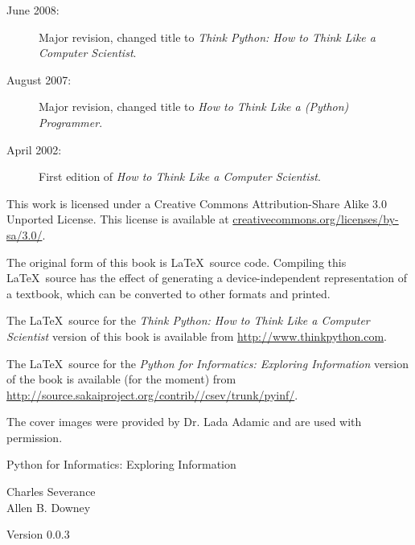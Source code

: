 \documentclass[10pt]{book}
\newcommand{\thetitle}{Python for Informatics: Exploring Information}
\newcommand{\theversion}{0.0.3}
\begin{document}
\begin{latexonly}
{\begin{description}
\item[June 2008:] Major revision, changed title to
{\em Think Python: How to Think Like
a Computer Scientist}.

\item[August 2007:] Major revision, changed title to
{\em How to Think Like a (Python) Programmer}.

\item[April 2002:] First edition of {\em How to Think Like
a Computer Scientist}.

\end{description}

\vspace{0.2in}


This work is licensed under a 
Creative Commons Attribution-Share Alike 3.0 Unported License.  This license is 
available at
\url{creativecommons.org/licenses/by-sa/3.0/}.

The original form of this book is \LaTeX\ source code.  Compiling this
\LaTeX\ source has the effect of generating a device-independent
representation of a textbook, which can be converted to other formats
and printed.

The \LaTeX\ source for the 
{\em Think Python: How to Think Like
a Computer Scientist}
version of this book is available from
\url{http://www.thinkpython.com}.

The \LaTeX\ source for the 
{\em Python for Informatics: Exploring Information}
version of the book is available (for the moment) from 
\url{http://source.sakaiproject.org/contrib//csev/trunk/pyinf/}.

The cover images were provided by Dr. Lada Adamic and are used
with permission.
\vspace{0.2in}

} %

\end{latexonly}



\begin{htmlonly}


{\Large \thetitle}

{\large 
Charles Severance\\
Allen B. Downey}

Version \theversion

\setcounter{chapter}{-1}

\end{htmlonly}
\end{document}
